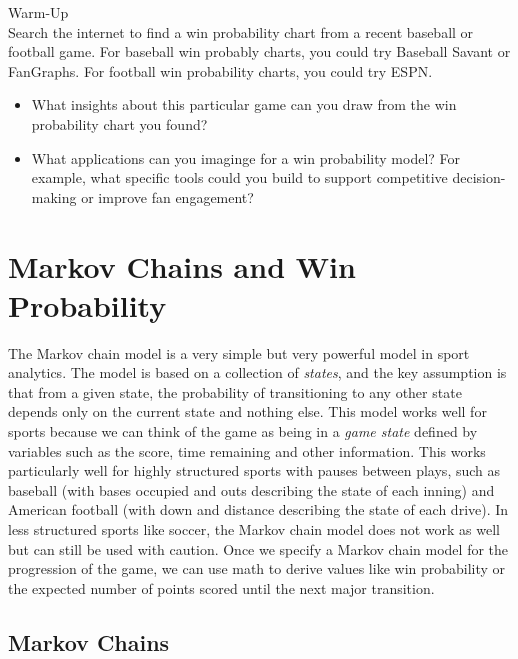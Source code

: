 \documentclass{article}
\begin{document}
  \begin{framed}
    {\sc Warm-Up}\\

    Search the internet to find a win probability chart from a recent baseball or football game. For baseball win probably charts, you could try Baseball Savant or FanGraphs. For football win probability charts, you could try ESPN.
    \begin{itemize}
      \item What insights about this particular game can you draw from the win probability chart you found?
      \item What applications can you imaginge for a win probability model? For example, what specific tools could you build to support competitive decision-making or improve fan engagement?
    \end{itemize}
  \end{framed}

  \setcounter{section}{5}
  \section{\sc Markov Chains and Win Probability}

  The Markov chain model is a very simple but very powerful model in sport analytics. The model is based on a collection of {\it states}, and the key assumption is that from a given state, the probability of transitioning to any other state depends only on the current state and nothing else. This model works well for sports because we can think of the game as being in a {\it game state} defined by variables such as the score, time remaining and other information. This works particularly well for highly structured sports with pauses between plays, such as baseball (with bases occupied and outs describing the state of each inning) and American football (with down and distance describing the state of each drive). In less structured sports like soccer, the Markov chain model does not work as well but can still be used with caution. Once we specify a Markov chain model for the progression of the game, we can use math to derive values like win probability or the expected number of points scored until the next major transition.

  \subsection{\sc Markov Chains}
  \label{sec:markov-chains}
\end{document}
